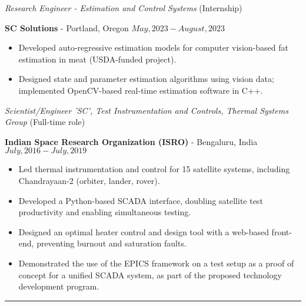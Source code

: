 \medskip

\noindent\textit{Research Engineer  - Estimation and Control Systems} (Internship)

\textbf{SC Solutions} - Portland, Oregon \hfill $May, 2023 - August, 2023$

\begin{itemize}
    \item Developed auto-regressive estimation models for computer vision-based fat estimation in meat (USDA-funded project).
    \item Designed state and parameter estimation algorithms using vision data; implemented OpenCV-based real-time estimation software in C++.
\end{itemize}

\medskip

\noindent\textit{Scientist/Engineer 'SC', Test Instrumentation and Controls, Thermal Systems Group} (Full-time role)

\textbf{Indian Space Research Organization (ISRO)} - Bengaluru, India \hfill $July, 2016 - July, 2019$

\begin{itemize}
        \item Led thermal instrumentation and control for 15 satellite systems, including Chandrayaan-2 (orbiter, lander, rover).
        \item Developed a Python-based SCADA interface, doubling satellite test productivity and enabling simultaneous testing.
	\item Designed an optimal heater control and design tool with a web-based front-end, preventing burnout and saturation faults.
        \item Demonstrated the use of the EPICS framework on a test setup as a proof of concept for a unified SCADA
                system, as part of the proposed technology development program.
\end{itemize}
\noindent\rule{\textwidth}{0.4pt}
